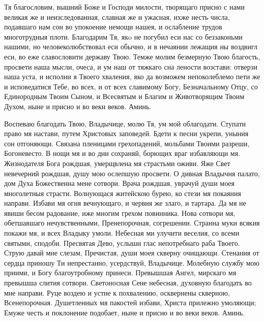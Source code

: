 \begin{mymulticols}

Тя благословим, вышний Боже и Господи милости, творящаго присно с нами великая же и неизследованная, славная же и ужасная, ихже несть числа, подавшаго нам сон во упокоение немощи нашея, и ослабление трудов многотрудныя плоти. Благодарим Тя, якo не погубил еси нас со беззаконьми нашими, но человеколюбствовал еси обычно, и в нечаянии лежащия ны воздвигл еси, во еже славословити державу Твою. Темже молим безмерную Твою благость, просвети наша мысли, очеса, и ум наш от тяжкаго сна лености возстави: отверзи наша уста, и исполни я Твоего хваления, яко да возможем непоколеблемо пети же и исповедатися Тебе, во всех, и от всех славимому Богу, Безначальному Отцу, со Единородным Твоим Сыном, и Всесвятым и Благим и Животворящим Твоим Духом, ныне и присно и во веки веков. Аминь.


Воспеваю благодать Твою, Владычице, молю Тя, ум мой облагодати. Ступати право мя настави, путем Христовых заповедей. Бдети к песни укрепи, уныния сон отгоняющи. Связана пленицами грехопадений, мольбами Твоими разреши, Богоневесто. В нощи мя и во дни сохраняй, борющих враг избавляющи мя. Жизнодателя Бога рождшая, умерщвлена мя страстьми оживи. Яже Свет невечерний рождшая, душу мою ослепшую просвети. О дивная Владычня палато, дом Духа Божественна мене сотвори. Врача рождшая, уврачуй души моея многолетныя страсти. Волнующася житейскою бурею, ко стези мя покаяния направи. Избави мя огня вечнующаго, и червия же злаго, и тартара. Да мя не явиши бесом радование, иже многим грехом повинника. Нова сотвори мя, обетшавшаго нечувственными, Пренепорочная, согрешении. Странна муки всякия покажи мя, и всех Владыку умоли. Небесная ми улучити веселия, со всеми святыми, сподоби. Пресвятая Дево, услыши глас непотребнаго раба Твоего. Струю давай мне слезам, Пречистая, души моея скверну очищающи. Стенания от сердца приношу Ти непрестанно, усердствуй, Владычице. Молебную службу мою приими, и Богу благоутробному принеси. Превышшая Ангел, мирскаго мя превышша слития сотвори. Светоносная Сене небесная, духовную благодать во мне направи. Руце воздею и устне к похвалению, осквернены скверною, Всенепорочная. Душетленных мя пакостей избави, Христа прилежно умоляющи; Емуже честь и поклонение подобает, ныне и присно и во веки веков. Аминь.



\end{mymulticols}
